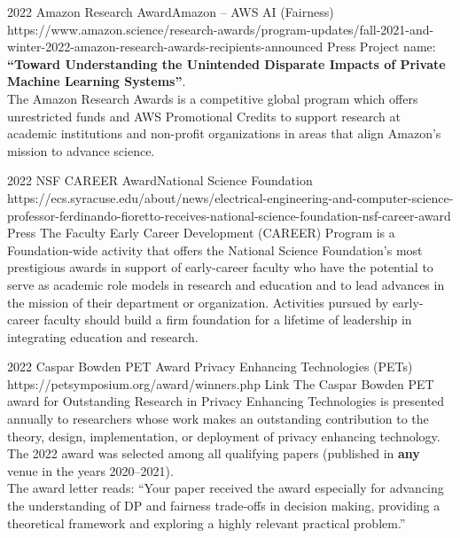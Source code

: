 

\begin{awards}

	\awardentryD
	{2022}
	{Amazon Research Award}{Amazon -- AWS AI (Fairness)}
	{https://www.amazon.science/research-awards/program-updates/fall-2021-and-winter-2022-amazon-research-awards-recipients-announced}%
	{Press}
	{
	Project name: \textbf{``Toward Understanding the Unintended Disparate Impacts of Private Machine Learning Systems''}.\\
	The Amazon Research Awards is a competitive global program which offers unrestricted funds and AWS Promotional Credits to support research at academic institutions and non-profit organizations in areas that align Amazon's mission to advance science.}

	\awardentryD
	{2022}
	{NSF CAREER Award}{National Science Foundation}
	{https://ecs.syracuse.edu/about/news/electrical-engineering-and-computer-science-professor-ferdinando-fioretto-receives-national-science-foundation-nsf-career-award}
	{Press}
	{
	The Faculty Early Career Development (CAREER) Program is a Foundation-wide activity that offers the National Science Foundation's most prestigious awards in support of early-career faculty who have the potential to serve as academic role models in research and education and to lead advances in the mission of their department or organization. Activities pursued by early-career faculty should build a firm foundation for a lifetime of leadership in integrating education and research. 
	}

	\awardentryD
	{2022}
	{Caspar Bowden PET Award}%
	{Privacy Enhancing Technologies (PETs)}
	{https://petsymposium.org/award/winners.php}
	{Link}
	{The Caspar Bowden PET award for Outstanding Research in Privacy Enhancing Technologies is presented annually to researchers 
	whose work makes an outstanding contribution to the theory, design, implementation, or deployment of privacy enhancing technology. The 2022 award was selected among all qualifying papers (published in \textbf{any} venue in the years 2020--2021).\\
	The award letter reads: ``Your paper  received the award especially for advancing the understanding of DP and fairness trade-offs in decision making, providing a theoretical framework and exploring a highly relevant practical problem.''}


\end{awards}
